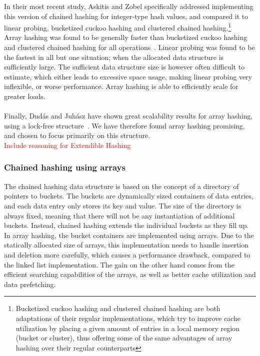 \documentclass[11pt]{article} %
\begin{document}
In their most recent study, Askitis and Zobel specifically addressed implementing this version of chained hashing for integer-type hash values, and compared it to linear probing, bucketized cuckoo hashing and clustered chained hashing.\footnote{Bucketized cuckoo hashing and clustered chained hashing are both adaptations of their regular implementations, which try to improve cache utilization by placing a given amount of entries in a local memory region (bucket or cluster), thus offering some of the same advantages of array hashing over their regular counterparts} \\

Array hashing was found to be generally faster than bucketized cuckoo hashing and clustered chained hashing for all operations~\cite{NA09}. Linear probing was found to be the fastest in all but one situation; when the allocated data structure is sufficiently large. The sufficient data structure size is however often difficult to estimate, which either leads to excessive space usage, making linear probing very inflexible, or worse performance. Array hashing is able to efficiently scale for greater loads. \\
\\
Finally, Dudás and Juhász have shown great scalability results for array hashing, using a lock-free structure~\cite{ADSJ13}. We have therefore found array hashing promising, and chosen to focus primarily on this structure. 
\\

\textcolor{red}{Include reasoning for Extendible Hashing}
\\

\subsubsection{Chained hashing using arrays}
The chained hashing data structure is based on the concept of a directory of pointers to buckets. The buckets are dynamically sized containers of data entries, and each data entry only stores its key and value.
The size of the directory is always fixed, meaning that there will not be any instantiation of additional buckets. Instead, chained hashing extends the individual buckets as they fill up. \\

In array hashing, the bucket containers are implemented using arrays. Due to the statically allocated size of arrays, this implementation needs to handle insertion and deletion more carefully, which causes a performance drawback, compared to the linked list implementation. The gain on the other hand comes from the efficient searching capabilities of the arrays, as well as better cache utilization and data prefetching.\\
\end{document}
